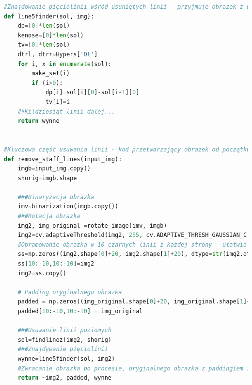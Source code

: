 \documentclass[12pt]{article}
\begin{document}
\begin{lstlisting}[language=Python]
#Znajdowanie pięciolinii wśród usuniętych linii - przyjmuje obrazek z usuniętymi liniami(img) i ich miejscami w obrazku(sol), zwraca miejsca występowania pięciolinii i ich parametry - szczególności wysokość pięciolinii i grubość linii, korzystając między innymi ze struktury zbiorów rozłącznych.
def line5finder(sol, img):
	dp=[0]*len(sol)
	kenose=[0]*len(sol)
	tv=[0]*len(sol)
	dtrl, dtrr=Hypers['Dt']
	for i, x in enumerate(sol):
		make_set(i)
		if (i>0):
			dp[i]=sol[i][0]-sol[i-1][0]
			tv[i]=i
	##Kildziesiąt linii dalej...
	return wynne
	
	
#Kluczowa część usuwania linii - kod przetwarzający obrazek od początku, zwracający obrazek z usuniętymi liniami.
def remove_staff_lines(input_img):
	imgb=input_img.copy()
	shorig=imgb.shape
	
	###Binaryzacja obrazka
	imv=binarization(imgb.copy())
	###Rotacja obrazka
	img2, img_original =rotate_image(imv, imgb)
	img2=cv.adaptiveThreshold(img2, 255, cv.ADAPTIVE_THRESH_GAUSSIAN_C, cv.THRESH_BINARY, Hypers['Binarization_conn'], 1)
	#Obramowanie obrazka w 10 czarnych linii z każdej strony - ułatwia dalsze przetwarzanie
	ss=np.zeros((img2.shape[0]+20, img2.shape[1]+20), dtype=str(img2.dtype))
	ss[10:-10,10:-10]=img2
	img2=ss.copy()
	
	# Padding oryginalnego obrazka
	padded = np.zeros((img_original.shape[0]+20, img_original.shape[1]+20), dtype=str(img_original.dtype))
	padded[10:-10,10:-10] = img_original
	
	###Usuwanie linii poziomych
	sol=findlinez(img2, shorig)
	###Znajdywanie pięciolinii 
	wynne=line5finder(sol, img2)
	#Zwracanie obrazka po procesie, oryginalnego obrazka z paddingiem i parametrów pięciolinii
	return ~img2, padded, wynne


\end{lstlisting}
\end{document}
